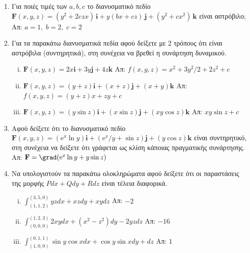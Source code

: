 




\pagestyle{askhseis}
\everymath{\displaystyle}



\begin{center}
  \minibox{\large\bfseries \textcolor{Col1}{Επικαμπύλιο Ολοκλήρωμα ΙΙου είδους
  (Ανεξαρτησία Διαδρομής)}}
\end{center}

\vspace{\baselineskip}

\begin{enumerate}

  \item Για ποιές τιμές των $ a,b,c $ το διανυσματικό πεδίο $ \mathbf{F}(x,y,z) =
    (y^{2}+2czx)
    \,\mathbf{i} + y(bx+cz) \,\mathbf{j} + (y^{2}+cx^{2}) \,\mathbf{k} $ είναι 
    αστρόβιλο; \hfill Απ: $ a=1, \; b=2, \; c=2 $ 

  \item Για τα παρακάτω διανυσματικά πεδία αφού δείξετε με 2 τρόπους ότι είναι 
    αστρόβιλα (συντηρητικά), στη συνέχεια να βρεθεί η συνάρτηση δυναμικού.
    \begin{enumerate}[i)]
      \item $ \mathbf{F}(x,y,z) = 2x \mathbf{i} + 3y \mathbf{j} + 4z \mathbf{k}
        $ \hfill Απ: $ f(x,y,z) = x^{2}+ {3y^{2}}/{2} + 2z^{2} +c $ 
      \item $ \mathbf{F}(x,y,z) = (y+z) \mathbf{i} + (x+z) \mathbf{j} + (x+y) \mathbf{k}
        $ \hfill Απ: $ f(x,y,z) = (y+z)x+zy + c $ 
      \item $ \mathbf{F}(x,y,z) = (y \sin{z}) \mathbf{i} + (x \sin{z}) \mathbf{j} + (xy
        \cos{z}) \mathbf{k} $ \hfill Απ: $ xy \sin{z} + c $ 
    \end{enumerate}

  \item Αφού δείξετε ότι το διανυσματικό πεδίο $ \mathbf{F}(x,y,z) = (\mathrm{e}^{x}
    \ln{y}) \mathbf{i} +
    ({\mathrm{e}^{x}}/{y} + \sin{z}) \mathbf{j} + (y \cos{z}) \mathbf{k} $ 
    είναι συντηρητικό, στη συνέχεια να δείξετε ότι γράφεται ως κλίση κάποιας 
    πραγματικής συνάρτησης. \hfill Απ: $ \mathbf{F}= \grad (\mathrm{e}^{x} \ln{y} + y
    \sin{z}) $ 

  \item Να υπολογιστούν τα παρακάτω ολοκληρώματα αφού δείξετε ότι οι παραστάσεις της
    μορφής $ P dx + Q dy + R dz $ είναι τέλεια διαφορικά.
    \begin{enumerate}[i)]
      \item $ \int _{(1,1,2)}^{(3,5,0)} yz dx + xz dy + xy dz $ 
        \hfill Απ: $ -2 $ 
      \item $ \int _{(0,0,0)}^{(1,2,3)} 2xy dx + (x^{2}-z^{2}) dy -2yzdz $ 
        \hfill Απ: $ -16 $ 
      \item $ \int _{(1,0,0)}^{(0,1,1)} \sin{y} \cos{x} dx + \cos{y} \sin{x} dy + dz $ 
        \hfill Απ: $1$ 
    \end{enumerate}


\end{enumerate}
